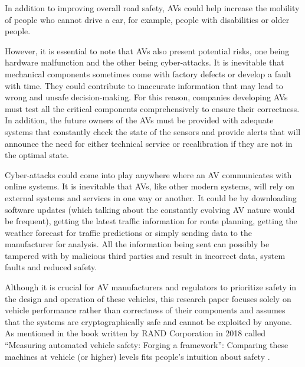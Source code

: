 In addition to improving overall road safety, AVs could help increase the mobility of people who cannot drive a car, for example, people with disabilities or older people.

However, it is essential to note that AVs also present potential risks, one being hardware malfunction and the other being cyber-attacks.
It is inevitable that mechanical components sometimes come with factory defects or develop a fault with time. They could contribute to inaccurate information that may lead to wrong and unsafe decision-making. For this reason, companies developing AVs must test all the critical components comprehensively to ensure their correctness. In addition, the future owners of the AVs must be provided with adequate systems that constantly check the state of the sensors and provide alerts that will announce the need for either technical service or recalibration if they are not in the optimal state.

Cyber-attacks could come into play anywhere where an AV communicates with online systems. It is inevitable that AVs, like other modern systems, will rely on external systems and services in one way or another. It could be by downloading software updates (which talking about the constantly evolving AV nature would be frequent), getting the latest traffic information for route planning, getting the weather forecast for traffic predictions or simply sending data to the manufacturer for analysis. All the information being sent can possibly be tampered with by malicious third parties and result in incorrect data, system faults and reduced safety.

Although it is crucial for AV manufacturers and regulators to prioritize safety in the design and operation of these vehicles, this research paper focuses solely on vehicle performance rather than correctness of their components and assumes that the systems are cryptographically safe and cannot be exploited by anyone. As mentioned in the book written by RAND Corporation in 2018 called “Measuring automated vehicle safety: Forging a framework”: Comparing these machines at vehicle (or higher) levels fits people’s intuition about safety \cite{fraade2018measuring}.